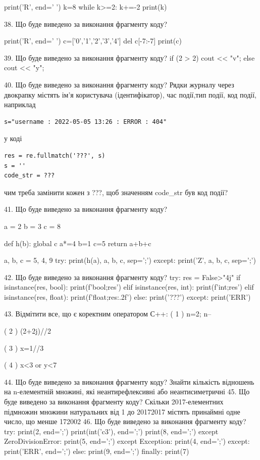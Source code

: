 \documentclass[11pt]{article}
\begin{document}
print('R', end=' ')
k=8
while k>=2:
    k+=-2
print(k)


38. Що буде виведено за виконання фрагменту коду?

print('R', end=' ')
c=['0','1','2','3','4']
del c[-7:-7]
print(c)


39. Що буде виведено за виконання фрагменту коду?
if (2 > 2)
    cout << "v";
else
    cout << "y";


40. Що буде виведено за виконання фрагменту коду?
Рядки журналу через двокрапку містять ім'я користувача (ідентифікатор), час події,тип події, код події, наприклад
\begin{verbatim}
s="username : 2022-05-05 13:26 : ERROR : 404"
\end{verbatim}
у коді 
\begin{verbatim}
res = re.fullmatch('???', s) 
s = ''
code_str = ??? 
\end{verbatim}
чим треба замінити кожен з ???, щоб значенням code\_str був код події? 



41. Що буде виведено за виконання фрагменту коду?

a = 2
b = 3
c = 8

def h(b):
global c    a*=4
    b=1
    c=5
    return a+b+c

a, b, c = 5, 4, 9
try:
    print(h(a), a, b, c, sep=';')
except:
    print('Z', a, b, c, sep=';')

42. Що буде виведено за виконання фрагменту коду?
try:
    res = False>"4j"
    if isinstance(res, bool):
        print(f'bool;{res}')
    elif isinstance(res, int):
        print(f'int;{res}')
    elif isinstance(res, float):
        print(f'float;{res:.2f}')
    else:
        print('???')
except:
    print('ERR')

43. %
Відмітити все, що є коректним оператором С++:
( 1 ) n=2; n--

( 2 ) (2+2j)//2

( 3 ) x=1//3

( 4 ) x<3 or y<7

44. Що буде виведено за виконання фрагменту коду?
Знайти кількість відношень на n-елементній множині, які неантирефлексивні або неантисиметричні
45. Що буде виведено за виконання фрагменту коду?
Скільки 2017-елементних підмножин множини натуральних від 1 до 20172017 містять принаймні одне число, що менше 172002
46. Що буде виведено за виконання фрагменту коду?
try:
    print(2, end=';')
    print(int('c3'), end=';')
    print(8, end=';')
except ZeroDivisionError:
    print(5, end=';')
except Exception:
    print(4, end=';')
except:
    print('ERR', end=';')
else:
    print(9, end=';')
finally:
    print(7)
\end{document}
